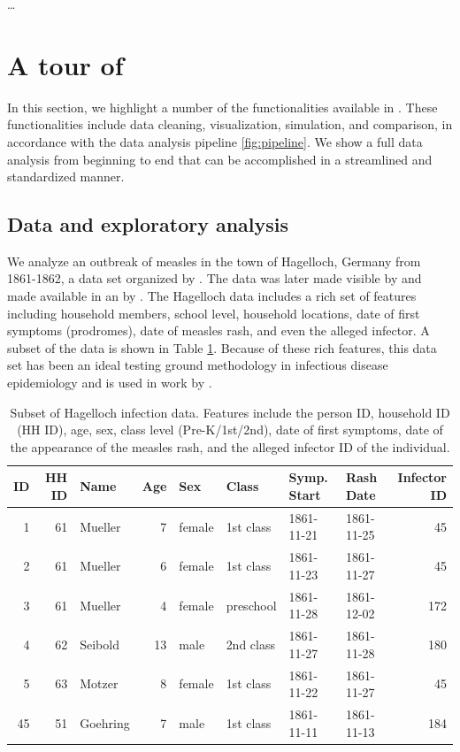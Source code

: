 \documentclass[
  shortnames]{jss}
\begin{document}
\ldots{}

\section[Tour]{A tour of }\label{sec:tour}

In this section, we highlight a number of the functionalities available
in . These functionalities include data cleaning,
visualization, simulation, and comparison, in accordance with the data
analysis pipeline \ref{fig:pipeline}. We show a full data analysis from
beginning to end that can be accomplished in a streamlined and
standardized manner.

\subsection{Data and exploratory analysis}

We analyze an outbreak of measles in the town of Hagelloch, Germany from
1861-1862, a data set organized by \cite{pfeilsticker1863}. The data was
later made visible by \cite{oesterle1992} and made available in an
 by \cite{surveillance2017}. The Hagelloch data includes a
rich set of features including household members, school level,
household locations, date of first symptoms (prodromes), date of measles
rash, and even the alleged infector. A subset of the data is shown in
Table \ref{tab:hags-people}. Because of these rich features, this data
set has been an ideal testing ground methodology in infectious disease
epidemiology and is used in work by
\cite{Neal2004,britton2011,groendyke2012,becker2016}.

\begin{CodeChunk}
\begin{table}[!h]

\caption{\label{tab:hags-people}Subset of Hagelloch infection data.  Features include the person ID, household ID (HH ID), age, sex, class level (Pre-K/1st/2nd), date of first symptoms, date of the appearance of the measles rash, and the alleged infector ID of the individual.}
\centering
\begin{tabular}[t]{rrlrllllr}
\toprule
ID & HH ID & Name & Age & Sex & Class & Symp. Start & Rash Date & Infector ID\\
\midrule
1 & 61 & Mueller & 7 & female & 1st class & 1861-11-21 & 1861-11-25 & 45\\
2 & 61 & Mueller & 6 & female & 1st class & 1861-11-23 & 1861-11-27 & 45\\
3 & 61 & Mueller & 4 & female & preschool & 1861-11-28 & 1861-12-02 & 172\\
4 & 62 & Seibold & 13 & male & 2nd class & 1861-11-27 & 1861-11-28 & 180\\
5 & 63 & Motzer & 8 & female & 1st class & 1861-11-22 & 1861-11-27 & 45\\
45 & 51 & Goehring & 7 & male & 1st class & 1861-11-11 & 1861-11-13 & 184\\
\bottomrule
\end{tabular}
\end{table}

\end{CodeChunk}
\end{document}
